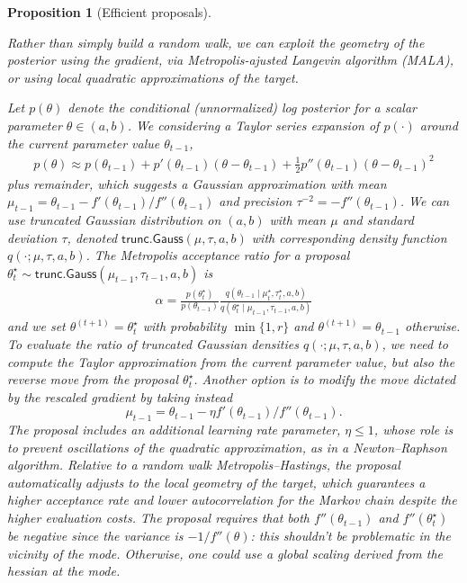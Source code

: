 \documentclass[
  11pt,
  letterpaper,
]{scrbook}
\theoremstyle{definition}
\theoremstyle{definition}
\theoremstyle{definition}
\theoremstyle{plain}
\newtheorem{proposition}{Proposition}[chapter]
\theoremstyle{plain}
\theoremstyle{remark}
\begin{document}
\begin{proposition}[Efficient
proposals]\protect\hypertarget{prp-mala}{}\label{prp-mala}

Rather than simply build a random walk, we can exploit the geometry of
the posterior using the gradient, via Metropolis-ajusted Langevin
algorithm (MALA), or using local quadratic approximations of the target.

Let \(p(\theta)\) denote the conditional (unnormalized) log posterior
for a scalar parameter \(\theta \in (a, b)\). We considering a Taylor
series expansion of \(p(\cdot)\) around the current parameter value
\(\theta_{t-1}\), \begin{align*}
 p(\theta) \approx p(\theta_{t-1}) + p'(\theta_{t-1})(\theta - \theta_{t-1}) + \frac{1}{2} p''(\theta_{t-1})(\theta - \theta_{t-1})^2
\end{align*} plus remainder, which suggests a Gaussian approximation
with mean
\(\mu_{t-1} = \theta_{t-1} - f'(\theta_{t-1})/f''(\theta_{t-1})\) and
precision \(\tau^{-2} = -f''(\theta_{t-1})\). We can use truncated
Gaussian distribution on \((a, b)\) with mean \(\mu\) and standard
deviation \(\tau\), denoted \(\mathsf{trunc. Gauss}(\mu, \tau, a, b)\)
with corresponding density function \(q(\cdot; \mu, \tau, a, b)\). The
Metropolis acceptance ratio for a proposal
\(\theta^{\star}_{t} \sim \mathsf{trunc. Gauss}(\mu_{t-1}, \tau_{t-1}, a, b)\)
is \begin{align*}
 \alpha = \frac{p(\theta^{\star}_{t})}{p(\theta_{t-1})} \frac{ q(\theta_{t-1} \mid \mu_{t}^{\star}, \tau_{t}^{\star}, a, b)}{q(\theta^{\star}_{t} \mid \mu_{t-1}, \tau_{t-1}, a, b)}
\end{align*} and we set \(\theta^{(t+1)} = \theta^{\star}_{t}\) with
probability \(\min\{1, r\}\) and \(\theta^{(t+1)} = \theta_{t-1}\)
otherwise. To evaluate the ratio of truncated Gaussian densities
\(q(\cdot; \mu, \tau, a, b)\), we need to compute the Taylor
approximation from the current parameter value, but also the reverse
move from the proposal \(\theta^{\star}_{t}\). Another option is to
modify the move dictated by the rescaled gradient by taking instead
\[\mu_{t-1} = \theta_{t-1} - \eta f'(\theta_{t-1})/f''(\theta_{t-1}).\]
The proposal includes an additional learning rate parameter,
\(\eta \leq 1\), whose role is to prevent oscillations of the quadratic
approximation, as in a Newton--Raphson algorithm. Relative to a random
walk Metropolis--Hastings, the proposal automatically adjusts to the
local geometry of the target, which guarantees a higher acceptance rate
and lower autocorrelation for the Markov chain despite the higher
evaluation costs. The proposal requires that both \(f''(\theta_{t-1})\)
and \(f''(\theta^{\star}_{t})\) be negative since the variance is
\(-1/f''(\theta)\): this shouldn't be problematic in the vicinity of the
mode. Otherwise, one could use a global scaling derived from the hessian
at the mode.


\end{proposition}
\end{document}
